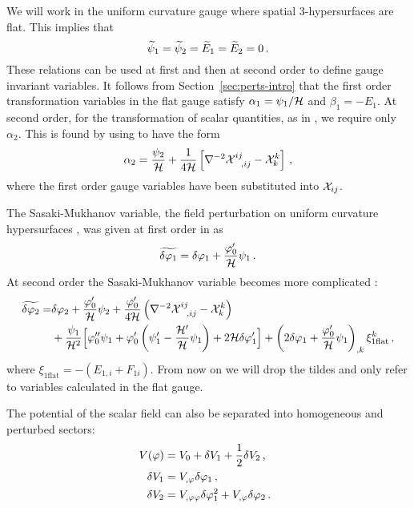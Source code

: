 % 
We will work in the uniform curvature gauge where spatial 3-hypersurfaces are flat.
This implies that
%  
\begin{equation}
 \label{eq:gauge-num}
\widetilde\psi_1=\widetilde\psi_2=\widetilde E_1=\widetilde E_2=0 \,.
\end{equation}
% 
These relations can be used at first and then at second order to define gauge
invariant variables. It follows from Section~\ref{sec:perts-intro} that the first
order
transformation variables in the flat gauge satisfy $\alpha_1 = \psi_1/\mathcal{H}$ and
$\beta_1
= -E_1$. At second order, for the transformation of scalar quantities, as in
, we require only $\alpha_2$. This is found by using
 to have the form
% 
\begin{equation}
 \label{eq:alpha2-perts}
\alpha_2=\frac{\psi_2}{\mathcal{H}}+\frac{1}{4\mathcal{H}}\left[
\nabla^{-2}\mathcal{X}^{ij}_{~~,ij}-\mathcal{X}^k_{ k}\right]\,,
\end{equation}
% 
where the first order gauge variables have been substituted into $\mathcal{X}_{ij}$.

The Sasaki-Mukhanov variable, \iec the field perturbation on uniform curvature
hypersurfaces \cite{Sasaki:1986hm,Mukhanov:1988jd}, was given at first order in
 as
%  
\begin{equation}
\label{eq:Q1I-num}
\widetilde{\delta\varphi_{1}}=\delta\varphi_{1}+\frac{\varphi_{0}'}{\mathcal{H}}\psi_1\,.
\end{equation}
% 
% 
At second order the Sasaki-Mukhanov variable becomes more complicated
\cite{Malik:2005cy,Malik:2003mv}:
% 
\begin{align}
\label{eq:Q2I-num}
% 
\wt{\dvp2} = &\dvp2
+\frac{\vp_0'}{\H}\psi_2
+\frac{\vp_0'}{4\H}\left(
\nabla^{-2}\X^{ij}_{~~,ij}-\X^k_{k}\right)
\\
&+\frac{\psi_1}{\H^2}\Big[\vp_0'' {\psi_1}
+\vp_0'\left(\psi_1'-\frac{\H'}{\H}\psi_1\right)+2\H\delta\vp_1'\Big]
+\left(2\dvp1+\frac{\vp_0'}{\H}\psi_1\right)_{,k}\xi_{1\mathrm{flat}}^k \,,
\end{align}
% 
where $\xi_{1\mathrm{flat}} = -(E_{1,i} +F_{1i})$. From now on we will
drop the tildes and only refer to variables calculated in the flat gauge.


The potential of the scalar field can also be separated into homogeneous and
perturbed sectors:
% 
\begin{align}
 V(\varphi) &= V_{0} + \delta V_{1} + \frac{1}{2}\delta V _{2}\,,\quad \\
 \delta V_{1} &= V_{,\varphi} \delta\varphi_{1} \,,\quad \\
 \delta V_{2} &= V_{,\varphi\varphi} \delta\varphi_{1}^2 + V_{,\varphi}\delta\varphi_{2} \,.
\end{align}
% 


